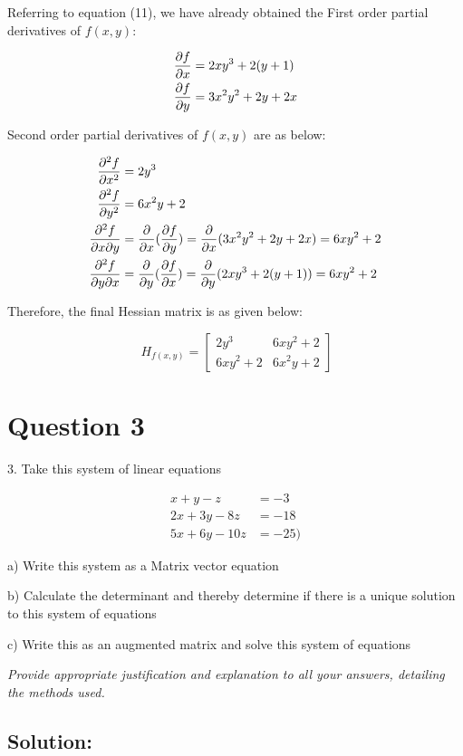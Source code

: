 \documentclass[a4paper]{report}
\begin{document}
Referring to equation (11), we have already obtained the First order partial derivatives of $f(x,y)$:

\begin{align*}
    \frac{\partial{f}}{\partial{x}} &= 2xy^3+2(y+1) \\
    \frac{\partial{f}}{\partial{y}} &= 3x^2y^2+2y+2x
\end{align*}


Second order partial derivatives of $f(x,y)$ are as below:

\begin{align*}
    \frac{\partial{^2f}}{\partial{x^2}}&=2y^3 \\
    \frac{\partial{^2f}}{\partial{y^2}} &= 6x^2y+2 \\
    \frac{\partial{^2f}}{\partial{x\partial y}} &= \frac{\partial{}}{\partial{x}}(\frac{\partial{f}}{\partial{y}}) = \frac{\partial{}}{\partial{x}}(3x^2y^2+2y+2x) = 6xy^2+2 \\
    \frac{\partial{^2f}}{\partial{y\partial x}} &= \frac{\partial{}}{\partial{y}}(\frac{\partial{f}}{\partial{x}}) = \frac{\partial{}}{\partial{y}}(2xy^3+2(y+1)) = 6xy^2+2
\end{align*}



Therefore, the final Hessian matrix is as given below:


\[\ \boxed{ H_{f(x,y)} =
\begin{bmatrix}
    2y^3 & 6xy^2+2 \\
    6xy^2+2 & 6x^2y+2     
\end{bmatrix}} \]

\newpage
\section*{Question 3}

3. Take this system of linear equations

\begin{align*}
    x+y-z&=-3 \\
2x+3y-8z&=-18 \\
5x+6y-10z&=-25)
\end{align*}


a) Write this system as a Matrix vector equation 

b) Calculate the determinant and thereby determine if there is a unique solution to this system of equations 

c) Write this as an augmented matrix and solve this system of equations 

\textit{Provide appropriate justification and explanation to all your answers, detailing the methods used.}

\subsection*{Solution:}
\end{document}
